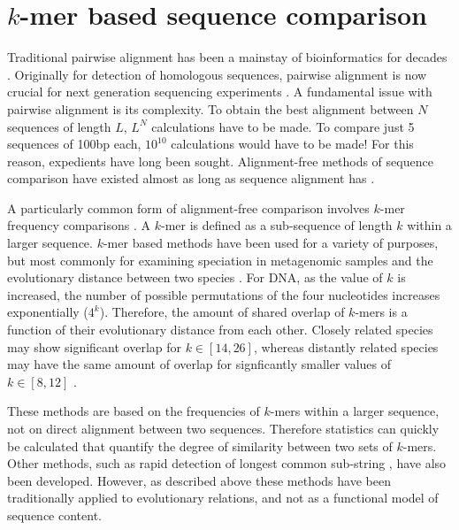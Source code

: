 \section{$k$-mer based sequence comparison}
Traditional pairwise alignment has been a mainstay of bioinformatics for decades \cite{Smith1981IdentificationSubsequences}. Originally for detection of homologous sequences, pairwise alignment is now crucial for next generation sequencing experiments \cite{Dobin2013STAR:Aligner,Langmead2009UltrafastGenome}. A fundamental issue with pairwise alignment is its complexity. To obtain the best alignment between $N$ sequences of length $L$, $L^N$ calculations have to be made. To compare just 5 sequences of 100bp each, $10^{10}$ calculations would have to be made! For this reason, expedients have long been sought. Alignment-free methods of sequence comparison have existed almost as long as sequence alignment has \cite{Haubold2014Alignment-freeGenetics,Vinga2003Alignment-freeReview}.

A particularly common form of alignment-free comparison involves $k$-mer frequency comparisons \cite{Haubold2014Alignment-freeGenetics}. A $k$-mer is defined as a sub-sequence of length $k$ within a larger sequence. $k$-mer based methods have been used for a variety of purposes, but most commonly for examining speciation in metagenomic samples and the evolutionary distance between two species \cite{Sims2011Whole-genomeFFPs,Yang2008PerformanceReconstruction,Yi2013Co-phylog:Organisms,Qi2004WholeApproach}. For DNA, as the value of $k$ is increased, the number of possible permutations of the four nucleotides increases exponentially ($4^k$). Therefore, the amount of shared overlap of $k$-mers is a function of their evolutionary distance from each other. Closely related species may show significant overlap for $k\in[14,26]$, whereas distantly related species may have the same amount of overlap for signficantly smaller values of $k\in[8,12]$ \cite{Qi2004WholeApproach,Yi2013Co-phylog:Organisms,Sims2011Whole-genomeFFPs}. 

These methods are based on the frequencies of $k$-mers within a larger sequence, not on direct alignment between two sequences. Therefore statistics can quickly be calculated that quantify the degree of similarity between two sets of $k$-mers. Other methods, such as rapid detection of longest common sub-string \cite{Ulitsky2006TheReconstruction}, have also been developed. However, as described above these methods have been traditionally applied to evolutionary relations, and not as a functional model of sequence content. 

